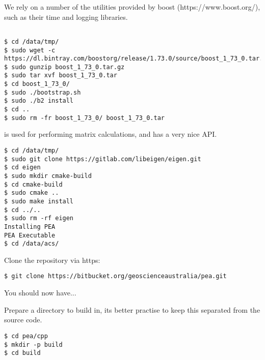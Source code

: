 We rely on a number of the utilities provided by boost (https://www.boost.org/), such as their time and logging libraries.
\begin{verbatim}

$ cd /data/tmp/
$ sudo wget -c https://dl.bintray.com/boostorg/release/1.73.0/source/boost_1_73_0.tar.gz
$ sudo gunzip boost_1_73_0.tar.gz
$ sudo tar xvf boost_1_73_0.tar
$ cd boost_1_73_0/
$ sudo ./bootstrap.sh
$ sudo ./b2 install
$ cd ..
$ sudo rm -fr boost_1_73_0/ boost_1_73_0.tar

\end{verbatim}

 is used for performing matrix calculations, and has a very nice API.
\begin{verbatim}
$ cd /data/tmp/
$ sudo git clone https://gitlab.com/libeigen/eigen.git
$ cd eigen
$ sudo mkdir cmake-build
$ cd cmake-build
$ sudo cmake ..
$ sudo make install
$ cd ../..
$ sudo rm -rf eigen
Installing PEA
PEA Executable
$ cd /data/acs/
\end{verbatim}
Clone the repository via https:

\begin{verbatim}
$ git clone https://bitbucket.org/geoscienceaustralia/pea.git
\end{verbatim}
You should now have...

Prepare a directory to build in, its better practise to keep this separated from the source code.
\begin{verbatim}
$ cd pea/cpp
$ mkdir -p build
$ cd build
\end{verbatim}

